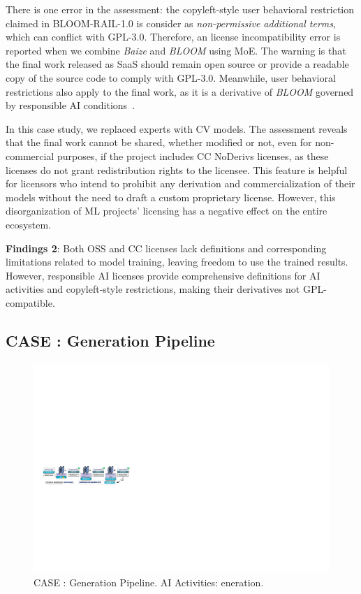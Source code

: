 There is one error in the assessment: the copyleft-style user behavioral restriction claimed in BLOOM-RAIL-1.0 is consider as \textit{non-permissive additional terms}, which can conflict with GPL-3.0.
Therefore, an license incompatibility error is reported when we combine \textit{Baize} and \textit{BLOOM} using MoE.
The warning is that the final work released as SaaS should remain open source or provide a readable copy of the source code to comply with GPL-3.0. 
Meanwhile, user behavioral restrictions also apply to the final work, as it is a derivative of \textit{BLOOM} governed by responsible AI conditions~\cite{contractor2022behavioral}.

In this case study, we replaced experts with CV models. 
The assessment reveals that the final work cannot be shared, whether modified or not, even for non-commercial purposes, if the project includes CC NoDerivs licenses, as these licenses do not grant redistribution rights to the licensee.
This feature is helpful for licensors who intend to prohibit any derivation and commercialization of their models without the need to draft a custom proprietary license.
However, this disorganization of ML projects' licensing has a negative effect on the entire ecosystem.

\begin{tcolorbox} 
\textbf{Findings 2}: Both OSS and CC licenses lack definitions and corresponding limitations related to model training, leaving freedom to use the trained results. 
However, responsible AI licenses provide comprehensive definitions for AI activities and copyleft-style restrictions, making their derivatives not GPL-compatible.
\end{tcolorbox}

\subsection{CASE  : Generation Pipeline}

\begin{figure}[h]
    \centering
    \includegraphics[width=\linewidth]{fig/case3.pdf}
    \caption{CASE : Generation Pipeline. AI Activities: eneration.}
    \Description{}
    \label{fig:case3}
\end{figure}

